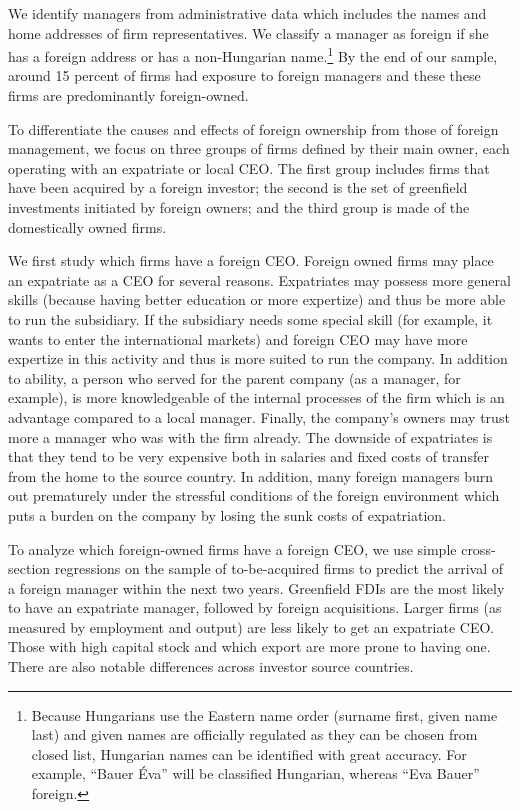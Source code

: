 \documentclass[12pt,a4paper]{article}
\begin{document}
We identify managers from administrative data which includes the names and home addresses of firm representatives. We classify a manager as foreign if she has a foreign address or has a non-Hungarian name.\footnote{Because Hungarians use the Eastern name order (surname first, given name last) and given names are officially regulated as they can be chosen from closed list, Hungarian names can be identified with great accuracy. For example, ``Bauer Éva'' will be classified Hungarian, whereas ``Eva Bauer'' foreign.} By the end of our sample, around 15 percent of firms had exposure to foreign managers and these these firms are predominantly foreign-owned.

To differentiate the causes and effects of foreign ownership from those of foreign management, we focus on three groups of firms defined by their main owner, each operating with an expatriate or local CEO. The first group includes firms that have been acquired by a foreign investor; the second is the set of greenfield investments initiated by foreign owners; and the third group is made of the domestically owned firms.

We first study which firms have a foreign CEO. Foreign owned firms may place an expatriate as a CEO for several reasons.  Expatriates may possess more general skills (because having better education or more expertize) and thus be more able to run the subsidiary. If the subsidiary needs some special skill (for example, it wants to enter the international markets) and foreign CEO may have more expertize in this activity and thus is more suited to run the company.  In addition to ability, a person who served for the parent company (as a manager, for example), is more knowledgeable of the internal processes of the firm which is an advantage compared to a local manager.  Finally, the company's owners may trust more a manager who was with the firm already. The downside of expatriates is that they tend to be very expensive both in salaries and fixed costs of transfer from the home to the source country.  In addition, many foreign managers burn out prematurely under the stressful conditions of the foreign environment which puts a burden on the company by losing the sunk costs of expatriation.

To analyze which foreign-owned firms have a foreign CEO, we use simple cross-section regressions on the sample of to-be-acquired firms to predict the arrival of a foreign manager within the next two years. Greenfield FDIs are the most likely to have an expatriate manager, followed by foreign acquisitions.  Larger firms (as measured by employment and output) are less likely to get an expatriate CEO.  Those with high capital stock and which export are more prone to having one.  There are also notable differences across investor source countries.
\end{document}
